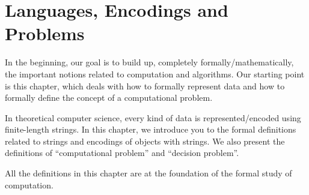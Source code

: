 \chapter{Languages, Encodings and Problems}
\label{chapter:Languages-Encodings-and-Problems}
\begin{preamble}
In the beginning, our goal is to build up, completely formally/mathematically, the important notions related to computation and algorithms. Our starting point is this chapter, which deals with how to formally represent data and how to formally define the concept of a computational problem.

In theoretical computer science, every kind of data is represented/encoded using finite-length strings. In this chapter, we introduce you to the formal definitions related to strings and encodings of objects with strings. We also present the definitions of ``computational problem'' and ``decision problem''. 

All the definitions in this chapter are at the foundation of the formal study of computation.
\end{preamble}
